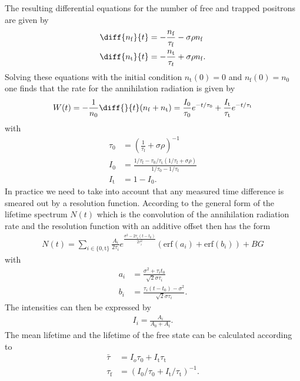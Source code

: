 The resulting differential equations for the number of free and trapped positrons are given by
\begin{align*}
  \diff{n_\mathrm{f}}{t}&=-\frac{n_\mathrm{f}}{\tau_\mathrm{f}}-\sigma \rho n_\mathrm{f}\\
  \diff{n_\mathrm{t}}{t}&=-\frac{n_\mathrm{t}}{\tau_t}+\sigma \rho n_\mathrm{f}.
\end{align*}
Solving these equations with the initial condition $n_\mathrm{t}(0)=0$ and $n_\mathrm{f}(0)=n_0$ one finds that the rate for the annihilation radiation is given by
\begin{align*}
  W(t)=-\frac{1}{n_0}\diff{}{t} (n_\mathrm{f}+n_\mathrm{t})=\frac{I_0}{\tau_0}e^{-t/\tau_0}+\frac{I_\mathrm{t}}{\tau_\mathrm{t}}e^{-t/\tau_\mathrm{t}}
\end{align*}
with
\begin{align*}
  \tau_0&=\left( \frac{1}{\tau_\mathrm{f}}+\sigma\rho\right)^{-1}\\
  I_0&=\frac{1/\tau_\mathrm{f}-\tau_0/\tau_\mathrm{t}(1/\tau_\mathrm{f}+\sigma\rho)}{1/\tau_0-1/\tau_t}\\   I_\mathrm{t}&=1-I_0.     
\end{align*}
In practice we need to take into account that any measured time difference is smeared out by a resolution function. According to \cite{further_instructions} the general form of the lifetime spectrum $N(t)$ which is the convolution of the annihilation radiation rate and the resolution function with an additive offset then has the form
\begin{align}
  N(t)=\sum_{i\in\{ 0,\mathrm{t}\}}\frac{A_i}{2\tau_i}e^{\frac{\sigma^2-2\tau_i(t-t_0)}{2\tau_i^2}}(\mathrm{erf}(a_i)+\mathrm{erf}(b_i))+BG
\label{eq:fit_rate}
\end{align}  
with
\begin{align*}
  a_i&=\frac{\sigma^2+\tau_it_0}{\sqrt{2}\sigma\tau_i}\\
  b_i&=\frac{\tau_i(t-t_0)-\sigma^2}{\sqrt{2}\sigma\tau_i}.
\end{align*}
The intensities can then be expressed by
\begin{align*}
  I_i=\frac{A_i}{A_0+A_\mathrm{t}}.
\end{align*}
The mean lifetime and the lifetime of the free state can be calculated according to 
\begin{align*}
  \bar{\tau}&=I_o\tau_0+ I_\mathrm{t}\tau_\mathrm{t}\\
  \tau_\mathrm{f}&=\left( I_0/\tau_0 + I_\mathrm{t}/\tau_\mathrm{t}\right)^{-1}.
\end{align*}
